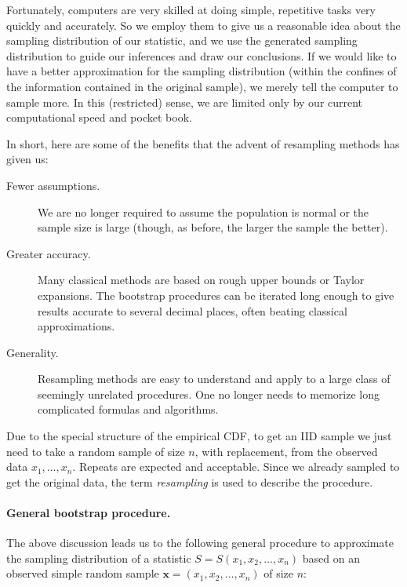 \documentclass[captions=tableheading]{scrbook}
\begin{document}
Fortunately, computers are very skilled at doing simple, repetitive tasks very quickly and accurately. So we employ them to give us a reasonable idea about the sampling distribution of our statistic, and we use the generated sampling distribution to guide our inferences and draw our conclusions. If we would like to have a better approximation for the sampling distribution (within the confines of the information contained in the original sample), we merely tell the computer to sample more. In this (restricted) sense, we are limited only by our current computational speed and pocket book.

In short, here are some of the benefits that the advent of resampling methods has given us:
\begin{description}
\item[Fewer assumptions.] We are no longer required to assume the population is normal or the sample size is large (though, as before, the larger the sample the better).
\item[Greater accuracy.] Many classical methods are based on rough upper bounds or Taylor expansions. The bootstrap procedures can be iterated long enough to give results accurate to several decimal places, often beating classical approximations.
\item[Generality.] Resampling methods are easy to understand and apply to a large class of seemingly unrelated procedures. One no longer needs to memorize long complicated formulas and algorithms.
\end{description}

\begin{rem}
Due to the special structure of the empirical CDF, to get an IID sample we just need to take a random sample of size \(n\), with replacement, from the observed data \(x_{1},\ldots,x_{n}\). Repeats are expected and acceptable. Since we already sampled to get the original data, the term \emph{resampling} is used to describe the procedure.
\end{rem}


\paragraph*{General bootstrap procedure.}

The above discussion leads us to the following general procedure to approximate the sampling distribution of a statistic \(S=S(x_{1},x_{2},\ldots,x_{n})\) based on an observed simple random sample \(\mathbf{x}=(x_{1},x_{2},\ldots,x_{n})\) of size \(n\): 
\end{document}
